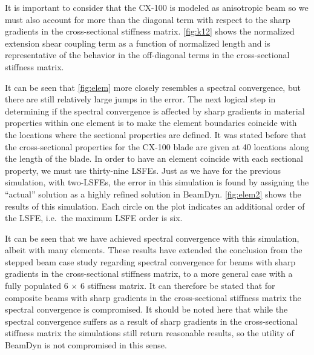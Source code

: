 \documentclass[letterpaper,12pt]{article}
\begin{document}

It is important to consider that the CX-100 is modeled as anisotropic beam so we must also account for more than the diagonal term with respect to the sharp gradients in the cross-sectional stiffness matrix. \ref{fig:k12} shows the normalized extension shear coupling term as a function of normalized length and is representative of the behavior in the off-diagonal terms in the cross-sectional stiffness matrix. 


It can be seen that \ref{fig:elem} more closely resembles a spectral convergence, but there are still relatively large jumps in the error. The next logical step in determining if the spectral convergence is affected by sharp gradients in material properties within one element is to make the element boundaries coincide with the locations where the sectional properties are defined. It was stated before that the cross-sectional properties for the CX-100 blade are given at 40 locations along the length of the blade. In order to have an element coincide with each sectional property, we must use thirty-nine LSFEs. Just as we have for the previous simulation, with two-LSFEs, the error in this simulation is found by assigning the ``actual'' solution as a highly refined solution in BeamDyn. \ref{fig:elem2} shows the results of this simulation. Each circle on the plot indicates an additional order of the LSFE, i.e.\ the maximum LSFE order is six.


It can be seen that we have achieved spectral convergence with this simulation, albeit with many elements. These results have extended the conclusion from the stepped beam case study regarding spectral convergence for beams with sharp gradients in the cross-sectional stiffness matrix, to a more general case with a fully populated 6 $\times$ 6 stiffness matrix. It can therefore be stated that for composite beams with sharp gradients in the cross-sectional stiffness matrix the spectral convergence is compromised. It should be noted here that while the spectral convergence suffers as a result of sharp gradients in the cross-sectional stiffness matrix the simulations still return reasonable results, so the utility of BeamDyn is not compromised in this sense.
\end{document}
